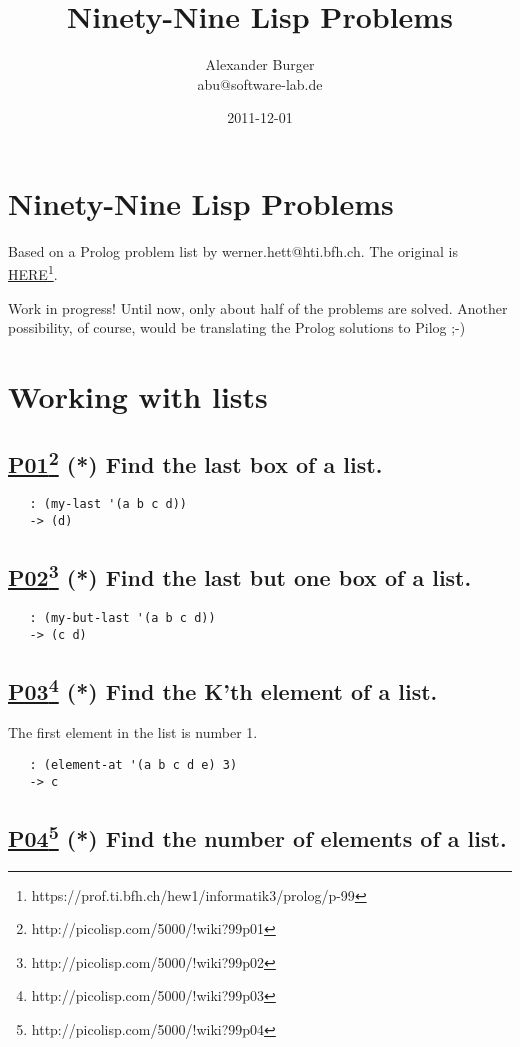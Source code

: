 \documentclass[10pt,a4paper]{article}
\title{Ninety-Nine Lisp Problems}
\author{Alexander Burger\\abu@software-lab.de}
\date{2011-12-01}
\begin{document}
\maketitle

\section*{Ninety-Nine Lisp Problems}

Based on a Prolog problem list by werner.hett@hti.bfh.ch. The original is
\underline{HERE}\footnote{https://prof.ti.bfh.ch/hew1/informatik3/prolog/p-99}.

Work in progress! Until now, only about half of the problems are solved. Another
possibility, of course, would be translating the Prolog solutions to Pilog ;-)

\section*{Working with lists}

\subsection*{\underline{P01}\footnote{http://picolisp.com/5000/!wiki?99p01} (*) Find the last box of a list.}
\begin{verbatim}
   : (my-last '(a b c d))
   -> (d)
\end{verbatim}


\subsection*{\underline{P02}\footnote{http://picolisp.com/5000/!wiki?99p02} (*) Find the last but one box of a list.}
\begin{verbatim}
   : (my-but-last '(a b c d))
   -> (c d)
\end{verbatim}


\subsection*{\underline{P03}\footnote{http://picolisp.com/5000/!wiki?99p03} (*) Find the K'th element of a list.}
The first element in the list is number 1.
\begin{verbatim}
   : (element-at '(a b c d e) 3)
   -> c
\end{verbatim}


\subsection*{\underline{P04}\footnote{http://picolisp.com/5000/!wiki?99p04} (*) Find the number of elements of a list.}
\end{document}
